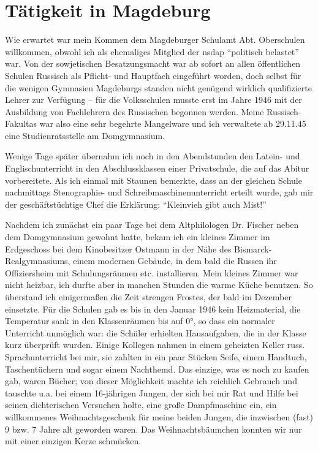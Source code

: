 \section{Tätigkeit in Magdeburg}

Wie erwartet war mein Kommen dem Magdeburger Schulamt Abt. Oberschulen willkommen, obwohl ich als ehemaliges Mitglied der \ac{nsdap} \enquote{politisch belastet} war. Von der sowjetischen Besatzungsmacht war ab sofort an allen öffentlichen Schulen Russisch als Pflicht- und Hauptfach eingeführt worden, doch selbst für die wenigen Gymnasien Magdeburgs standen nicht genügend wirklich qualifizierte Lehrer zur Verfügung -- für die Volksschulen musste erst im Jahre 1946 mit der Ausbildung von Fachlehrern des Russischen begonnen werden. Meine Russisch-Fakultas war also eine sehr begehrte Mangelware und ich verwaltete ab 29.11.45 eine Studienratsstelle am Domgymnasium.

Wenige Tage später übernahm ich noch in den Abendstunden den Latein- und Englischunterricht in den Abschlussklassen einer Privatschule, die auf das Abitur vorbereitete. Als ich einmal mit Staunen bemerkte, dass an der gleichen Schule nachmittags Stenographie- und Schreibmaschinenunterricht erteilt wurde, gab mir der geschäftstüchtige Chef die Erklärung: \enquote{Kleinvieh gibt auch Mist!}

Nachdem ich zunächst ein paar Tage bei dem Altphilologen Dr. Fischer neben dem Domgymnasium gewohnt hatte, bekam ich ein kleines Zimmer  im Erdgeschoss bei dem Kinobesitzer Ostmann in der Nähe des Bismarck-Realgymnasiums, einem modernen Gebäude, in dem bald die Russen ihr Offiziersheim mit Schulungsräumen etc. installieren. Mein kleines Zimmer war nicht heizbar, ich durfte aber in manchen Stunden die warme Küche benutzen. So überstand ich einigermaßen die Zeit strengen Frostes, der bald im Dezember einsetzte. Für die Schulen gab es bis in den Januar 1946 kein Heizmaterial, die Temperatur sank in den Klassenräumen bis auf 0°, so dass ein normaler Unterricht unmöglich war: die Schüler erhielten Hausaufgaben, die in der Klasse kurz überprüft wurden. Einige Kollegen nahmen in einem geheizten Keller russ. Sprachunterricht bei mir, sie zahlten in ein paar Stücken Seife, einem Handtuch, Taschentüchern und sogar einem Nachthemd. Das einzige, was es noch zu kaufen gab, waren Bücher; von dieser Möglichkeit machte ich reichlich Gebrauch und tauschte u.a. bei einem 16-jährigen Jungen, der sich bei mir Rat und Hilfe bei seinen dichterischen Versuchen holte, eine große Dampfmaschine ein, ein willkommenes Weihnachtsgeschenk für meine beiden Jungen, die inzwischen (fast) 9 bzw. 7 Jahre alt geworden waren. Das Weihnachtsbäumchen konnten wir nur mit einer einzigen Kerze schmücken.

